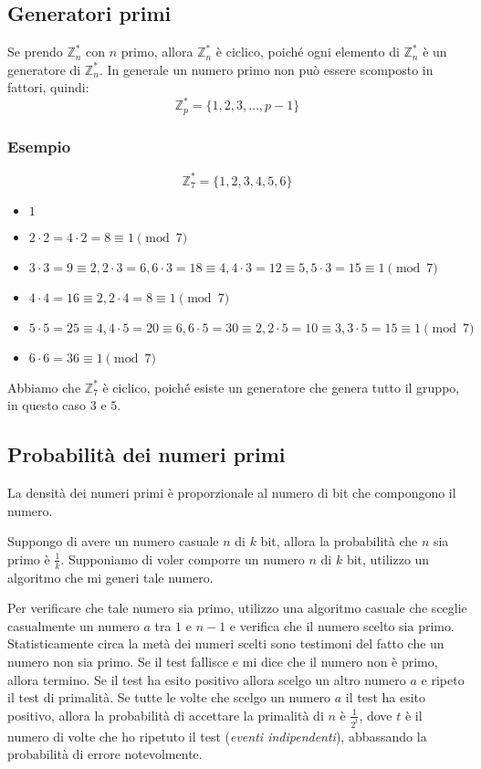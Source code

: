 \subsection{Generatori primi}
Se prendo $\mathbb{Z}_{n}^*$ con $n$ primo, allora $\mathbb{Z}_{n}^*$ è ciclico, poiché
ogni elemento di $\mathbb{Z}_{n}^*$ è un generatore di $\mathbb{Z}_{n}^*$.
In generale un numero primo non può essere scomposto in fattori, quindi:
\[
  \mathbb{Z}_{p}^* = \{1,2,3,\dots,p-1\}
\]
\subsubsection{Esempio}
\[
  \mathbb{Z}_{7}^* = \{1,2,3,4,5,6\}
\]
\begin{itemize}
  \item $1$
  \item $2 \cdot 2 = 4 \cdot 2 = 8 \equiv 1 \pmod{7}$
  \item $3 \cdot 3 = 9 \equiv 2, 2 \cdot 3 = 6, 6 \cdot 3 = 18 \equiv 4, 4 \cdot 3 = 12 \equiv 5, 5 \cdot 3 = 15 \equiv 1 \pmod{7}$
  \item $4 \cdot 4 = 16 \equiv 2, 2 \cdot 4 = 8 \equiv 1 \pmod{7}$
  \item $5 \cdot 5 = 25 \equiv 4, 4 \cdot 5 = 20 \equiv 6, 6 \cdot 5 = 30 \equiv 2, 2 \cdot 5 = 10 \equiv 3, 3 \cdot 5 = 15 \equiv 1 \pmod{7}$
  \item $6 \cdot 6 = 36 \equiv 1 \pmod{7}$
\end{itemize}
Abbiamo che $\mathbb{Z}_{7}^*$ è ciclico, poiché esiste un generatore che genera tutto il gruppo, in questo 
caso $3$ e $5$.

\subsection{Probabilità dei numeri primi}
\begin{theorem}
  La densità dei numeri primi è proporzionale al numero di bit che compongono il numero.
\end{theorem}
Suppongo di avere un numero casuale $n$ di $k$ bit, allora la probabilità che $n$ sia primo è 
$\frac{1}{k}$. Supponiamo di voler comporre un numero $n$ di $k$ bit, utilizzo un algoritmo
che mi generi tale numero. 

Per verificare che tale numero sia primo, utilizzo una algoritmo casuale 
che sceglie casualmente un numero $a$ tra $1$ e $n-1$ e verifica che il numero 
scelto sia primo. Statisticamente circa la metà dei numeri scelti sono testimoni del fatto 
che un numero non sia primo. Se il test fallisce e mi dice che il numero non è primo, allora
termino. Se il test ha esito positivo allora scelgo un altro numero $a$ e ripeto il test di 
primalità.
Se tutte le volte che scelgo un numero $a$ il test ha esito positivo, allora la probabilità 
di accettare la primalità di $n$ è $\frac{1}{2^t}$, dove $t$ è il numero di volte che ho
ripetuto il test (\textit{eventi indipendenti}), abbassando la probabilità di errore notevolmente.


